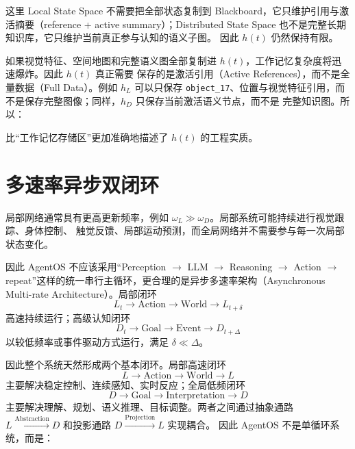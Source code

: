 这里 Local State Space 不需要把全部状态复制到 Blackboard，它只维护引用与激活摘要（reference +
active summary）；Distributed State Space 也不是完整长期知识库，它只维护当前真正参与认知的语义子图。
因此 $h(t)$ 仍然保持有限。

如果视觉特征、空间地图和完整语义图全部复制进 $h(t)$，工作记忆复杂度将迅速爆炸。因此 $h(t)$ 真正需要
保存的是激活引用（Active References），而不是全量数据（Full Data）。例如 $h_L$ 可以只保存
\verb|object_17|、位置与视觉特征引用，而不是保存完整图像；同样，$h_D$ 只保存当前激活语义节点，而不是
完整知识图。所以：

\begin{statementbox}
\centering
{}
\end{statementbox}

比“工作记忆存储区”更加准确地描述了 $h(t)$ 的工程实质。

\section{多速率异步双闭环}

局部网络通常具有更高更新频率，例如 $\omega_L\gg\omega_D$。局部系统可能持续进行视觉跟踪、身体控制、
触觉反馈、局部运动预测，而全局网络并不需要参与每一次局部状态变化。

因此 AgentOS 不应该采用“Perception $\rightarrow$ LLM $\rightarrow$ Reasoning $\rightarrow$ Action
$\rightarrow$ repeat”这样的统一串行主循环，更合理的是异步多速率架构（Asynchronous Multi-rate
Architecture）。局部闭环
\[
L_t\rightarrow\mathrm{Action}\rightarrow\mathrm{World}\rightarrow L_{t+\delta}
\]
高速持续运行；高级认知闭环
\[
D_t\rightarrow\mathrm{Goal}\rightarrow\mathrm{Event}\rightarrow D_{t+\Delta}
\]
以较低频率或事件驱动方式运行，满足 $\delta\ll\Delta$。

因此整个系统天然形成两个基本闭环。局部高速闭环
\[
\boxed{
L\rightarrow\mathrm{Action}\rightarrow\mathrm{World}\rightarrow L
}
\]
主要解决稳定控制、连续感知、实时反应；全局低频闭环
\[
\boxed{
D\rightarrow\mathrm{Goal}\rightarrow\mathrm{Interpretation}\rightarrow D
}
\]
主要解决理解、规划、语义推理、目标调整。两者之间通过抽象通路
$L\xrightarrow{\mathrm{Abstraction}}D$ 和投影通路 $D\xrightarrow{\mathrm{Projection}}L$ 实现耦合。
因此 AgentOS 不是单循环系统，而是：

\begin{statementbox}
\centering
{}
\end{statementbox}

